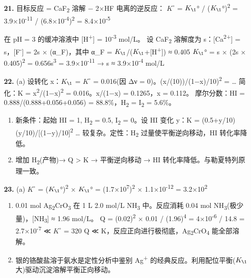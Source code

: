 \documentclass[a4paper,11pt]{ctexart}
\begin{document}
\textbf{21.} 目标反应 = CaF\textsubscript{2} 溶解 − 2×HF 电离的逆反应：
\(K^{\circ}\) = \(K_{\1}\)° / (\(K_{\1}\)°)\textsuperscript{2} = 3.9×10\textsuperscript{-11} / (6.8×10\textsuperscript{-4})\textsuperscript{2} = 8.4×10\textsuperscript{-5}

在 pH = 3 的缓冲溶液中 {[}H\textsuperscript{+}{]} = 10\textsuperscript{-3} mol/L。
设 CaF\textsubscript{2} 溶解度为 s：{[}Ca\textsuperscript{2+}{]} = s，{[}F\textsuperscript{-}{]} = 2s × (α\_F)，其中 α\_F = \(K_{\1}\)/(\(K_{\1}\)+{[}H\textsuperscript{+}{]}) ≈ 0.405
\(K_{\1}\)° = s × (2s × 0.405)\textsuperscript{2} = 0.656s\textsuperscript{3} = 3.9×10\textsuperscript{-11} → s ≈ 3.9×10\textsuperscript{-4} mol/L

\textbf{22.}
(a) 设转化 x：\(K_{\1}\) = \(K^{\circ}\) = 0.016(因 Δν = 0)。(x/(10))/(1−x)/10)\textsuperscript{2} = \ldots{} 简化：K = x\textsuperscript{2}/(1−x)\textsuperscript{2} = 0.016。x/(1−x) = 0.1265，x = 0.112。
摩尔分数：HI = 0.888/(0.888+0.056+0.056) = 88.8\%，H\textsubscript{2} = I\textsubscript{2} = 5.6\%。

\begin{enumerate}
\def\labelenumi{(\alph{enumi})}
\setcounter{enumi}{1}
\item
  新条件：起始 HI = 1, H\textsubscript{2} = 0.5, I\textsubscript{2} = 0。设 HI 变化 y：K = (0.5+y/10)(y/10)/{[}(1−y)/10{]}\textsuperscript{2} \ldots{} 较复杂。定性：H\textsubscript{2} 过量使平衡逆向移动，HI 转化率降低。
\item
  增加 H\textsubscript{2}(产物)→ Q \textgreater{} K → 平衡逆向移动 → HI 转化率降低。与勒夏特列原理一致。
\end{enumerate}

\textbf{23.}
(a) \(K^{\circ}\) = (\(K_{\1}\)°)\textsuperscript{2} × \(K_{\1}\)° = (1.7×10\textsuperscript{7})\textsuperscript{2} × 1.1×10\textsuperscript{-12} = 3.2×10\textsuperscript{2}

\begin{enumerate}
\def\labelenumi{(\alph{enumi})}
\setcounter{enumi}{1}
\item
  0.01 mol Ag\textsubscript{2}CrO\textsubscript{3} 在 1 L 2.0 mol/L NH\textsubscript{3} 中。反应消耗 0.04 mol NH\textsubscript{3}(极少量)，{[}NH\textsubscript{3}{]} ≈ 1.96 mol/L。
  Q = (0.02)\textsuperscript{2} × 0.01 / (1.96)\textsuperscript{4} = 4×10\textsuperscript{-6} / 14.8 = 2.7×10\textsuperscript{-7} ≪ \(K^{\circ}\) = 320
  Q ≪ K，反应正向进行极彻底，Ag\textsubscript{2}CrO\textsubscript{4} 能全部溶解。
\item
  银的铬酸盐溶于氨水是定性分析中鉴别 Ag\textsuperscript{+} 的经典反应。利用配位平衡(\(K_{\1}\) 大)驱动沉淀溶解平衡正向移动。
\end{enumerate}
\end{document}
